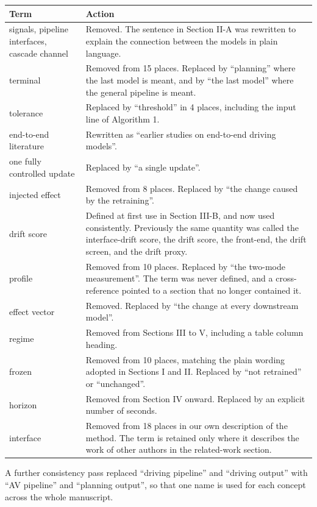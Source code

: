 \documentclass[11pt,a4paper]{article}
\begin{document}
\begin{longtable}{@{}p{}p{}@{}}
\toprule
\textbf{Term} & \textbf{Action} \\
\midrule
\endhead
signals, pipeline interfaces,
cascade channel & Removed. The sentence in Section II-A was rewritten to explain
the connection between the models in plain language. \\
terminal & Removed from 15 places. Replaced by ``planning'' where the last model
is meant, and by ``the last model'' where the general pipeline is meant. \\
tolerance & Replaced by ``threshold'' in 4 places, including the input line of
Algorithm 1. \\
end-to-end literature & Rewritten as ``earlier studies on end-to-end driving
models''. \\
one fully controlled update & Replaced by ``a single update''. \\
injected effect & Removed from 8 places. Replaced by ``the change caused by the
retraining''. \\
drift score & Defined at first use in Section III-B, and now used consistently.
Previously the same quantity was called the interface-drift score, the drift
score, the front-end, the drift screen, and the drift proxy. \\
profile & Removed from 10 places. Replaced by ``the two-mode measurement''. The
term was never defined, and a cross-reference pointed to a section that no longer
contained it. \\
effect vector & Removed. Replaced by ``the change at every downstream model''. \\
regime & Removed from Sections III to V, including a table column heading. \\
frozen & Removed from 10 places, matching the plain wording adopted in Sections I
and II. Replaced by ``not retrained'' or ``unchanged''. \\
horizon & Removed from Section IV onward. Replaced by an explicit number of
seconds. \\
interface & Removed from 18 places in our own description of the method. The term
is retained only where it describes the work of other authors in the related-work
section. \\
\bottomrule
\end{longtable}

\noindent
A further consistency pass replaced ``driving pipeline'' and ``driving output''
with ``AV pipeline'' and ``planning output'', so that one name is used for each
concept across the whole manuscript.
\end{document}
